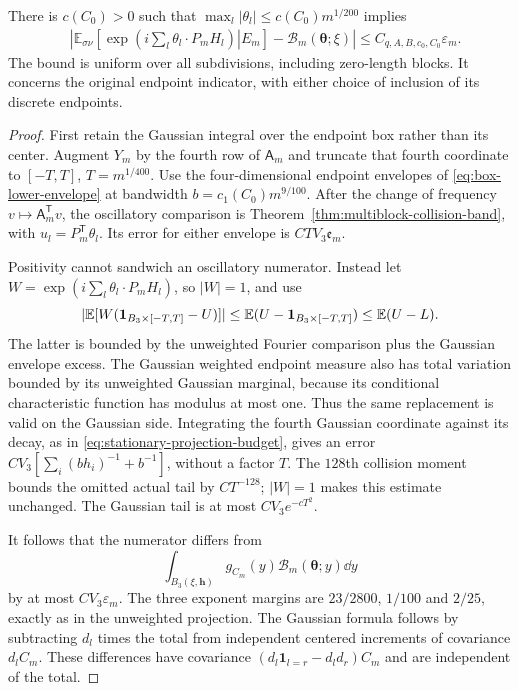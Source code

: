 \begin{proposition}
\label{prop:window-conditional-characteristic}
There is $c(C_0)>0$ such that
$\max_l|\theta_l|\le c(C_0)m^{1/200}$ implies
\begin{align}
 &\left|\mathbb E_{\sigma\nu}
  \left[\left.\exp\left(i\sum_l\theta_l\cdot P_mH_l\right)
                          \right|E_m\right]
           -\mathcal B_m(\boldsymbol\theta;\xi)\right|
       \le C_{q,A,B,c_0,C_0}\varepsilon_m .
 \label{eq:window-conditional-characteristic}
\end{align}
The bound is uniform over all subdivisions, including zero-length
blocks. It concerns the original endpoint indicator, with either
choice of inclusion of its discrete endpoints.
\end{proposition}
\begin{proof}
First retain the Gaussian integral over the endpoint box rather than
its center. Augment $Y_m$ by the fourth row of $\mathsf A_m$ and
truncate that fourth coordinate to $[-T,T]$, $T=m^{1/400}$.
Use the four-dimensional endpoint envelopes of
\eqref{eq:box-lower-envelope} at bandwidth $b=c_1(C_0)m^{9/100}$.
After the change of frequency $v\mapsto\mathsf A_m^{\mathsf T}v$,
the oscillatory comparison is
Theorem~\ref{thm:multiblock-collision-band}, with
$u_l=P_m^{\mathsf T}\theta_l$. Its error for either envelope is
$C T V_3\mathfrak e_m$.

Positivity cannot sandwich an oscillatory numerator. Instead let
$W=\exp(i\sum_l\theta_l\cdot P_mH_l)$, so $|W|=1$, and use
\[
 |\mathbb E[W(\mathbf1_{B_3\times[-T,T]}-U)]|
                  \le\mathbb E(U-\mathbf1_{B_3\times[-T,T]})
                  \le\mathbb E(U-L).
\]
The latter is bounded by the unweighted Fourier comparison plus the
Gaussian envelope excess. The Gaussian weighted endpoint measure
also has total variation bounded by its unweighted Gaussian marginal,
because its conditional characteristic function has modulus at most
one. Thus the same replacement is valid on the Gaussian side.
Integrating the fourth Gaussian coordinate against its decay, as in
\eqref{eq:stationary-projection-budget}, gives an error
$C V_3[\sum_i(bh_i)^{-1}+b^{-1}]$, without a factor $T$.
The $128$th collision moment bounds the omitted actual tail by
$CT^{-128}$; $|W|=1$ makes this estimate unchanged. The Gaussian
tail is at most $C V_3e^{-cT^2}$.

It follows that the numerator differs from
\[
 \int_{B_3(\xi,\mathbf h)}g_{C_m}(y)
                         \mathcal B_m(\boldsymbol\theta;y)\dd y
\]
by at most $C V_3\varepsilon_m$. The three exponent margins are
$23/2800$, $1/100$ and $2/25$, exactly as in the unweighted projection.
The Gaussian formula follows by subtracting $d_l$ times the total
from independent centered increments of covariance $d_l C_m$.
These differences have covariance
$(d_l\mathbf1_{l=r}-d_ld_r)C_m$ and are independent of the total.


\end{proof}

